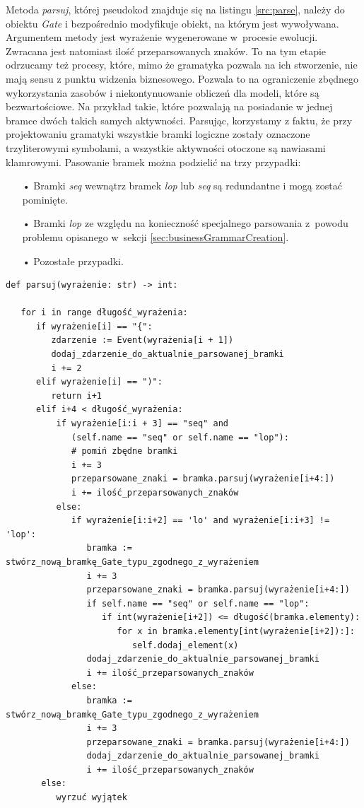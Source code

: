Metoda \textit{parsuj}, której pseudokod znajduje się na listingu \ref{src:parse}, należy do obiektu \textit{Gate} i bezpośrednio modyfikuje obiekt, na którym jest wywoływana. Argumentem metody jest wyrażenie wygenerowane w~procesie ewolucji. Zwracana jest natomiast ilość przeparsowanych znaków. To na tym etapie odrzucamy też procesy, które, mimo że gramatyka pozwala na ich stworzenie, nie mają sensu z punktu widzenia biznesowego. Pozwala to na ograniczenie zbędnego wykorzystania zasobów i niekontynuowanie obliczeń dla modeli, które są bezwartościowe. Na przykład takie, które pozwalają na posiadanie w jednej bramce dwóch takich samych aktywności. Parsując, korzystamy z faktu, że przy projektowaniu gramatyki wszystkie bramki logiczne zostały oznaczone trzyliterowymi symbolami, a wszystkie aktywności otoczone są nawiasami klamrowymi. Pasowanie bramek można podzielić na trzy przypadki:
\begin{itemize}   
  \item[•] Bramki \textit{seq} wewnątrz bramek \textit{lop} lub \textit{seq} są redundantne i mogą zostać pominięte.
  \item[•] Bramki \textit{lop} ze względu na konieczność specjalnego parsowania z~powodu problemu opisanego w~sekcji \ref{sec:businessGrammarCreation}.
  \item[•] Pozostałe przypadki.
\end{itemize}


\lstset{caption=Pseudokod parsera gramatyki, captionpos=b}
\lstset{label=src:parse, frame=single}
\begin{lstlisting}[escapeinside=``]
def parsuj(wyrażenie: str) -> int:

   for i in range długość_wyrażenia:
      if wyrażenie[i] == "{":
         zdarzenie := Event(wyrażenia[i + 1])
         dodaj_zdarzenie_do_aktualnie_parsowanej_bramki 
         i += 2
      elif wyrażenie[i] == ")":
         return i+1
      elif i+4 < długość_wyrażenia:
          if wyrażenie[i:i + 3] == "seq" and 
             (self.name == "seq" or self.name == "lop"):
             # pomiń zbędne bramki
             i += 3
             przeparsowane_znaki = bramka.parsuj(wyrażenie[i+4:])
             i += ilość_przeparsowanych_znaków
          else:
             if wyrażenie[i:i+2] == 'lo' and wyrażenie[i:i+3] != 'lop':  
                bramka := stwórz_nową_bramkę_Gate_typu_zgodnego_z_wyrażeniem 
                i += 3
                przeparsowane_znaki = bramka.parsuj(wyrażenie[i+4:])
                if self.name == "seq" or self.name == "lop":
                   if int(wyrażenie[i+2]) <= długość(bramka.elementy):
                      for x in bramka.elementy[int(wyrażenie[i+2]):]:
                         self.dodaj_element(x)
                dodaj_zdarzenie_do_aktualnie_parsowanej_bramki 
                i += ilość_przeparsowanych_znaków
             else:
                bramka := stwórz_nową_bramkę_Gate_typu_zgodnego_z_wyrażeniem 
                i += 3
                przeparsowane_znaki = bramka.parsuj(wyrażenie[i+4:])
                dodaj_zdarzenie_do_aktualnie_parsowanej_bramki 
                i += ilość_przeparsowanych_znaków
       else:
          wyrzuć wyjątek
\end{lstlisting}

